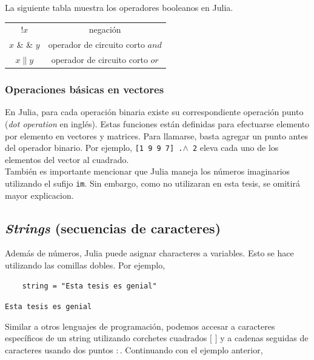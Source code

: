La siguiente tabla muestra los operadores booleanos en Julia. 

\begin{center}
\begin{tabular}{ |c|c| } 
 \hline
 $!x$ & negación \\ 
 $x$ \& \& $y$ & operador de circuito corto $and$ \\ 
 $x \parallel y$ & operador de circuito corto $or$ \\ 
 \hline
\end{tabular}
\end{center}

\subsubsection{Operaciones básicas en vectores}
En Julia, para cada operación binaria existe su correspondiente operación punto (\textit{dot operation} en inglés). Estas funciones están definidas para efectuarse elemento por elemento en vectores y matrices. Para llamarse, basta agregar un punto antes del operador binario. Por ejemplo,
 \texttt{[1 9 9 7] .$\wedge$ 2} eleva cada uno de los elementos del vector al cuadrado. 
\\
También es importante mencionar que Julia maneja los números imaginarios utilizando el sufijo \texttt{im}. Sin embargo, como no utilizaran en esta tesis, se omitirá mayor explicacion. 


\subsection{\textit{Strings} (secuencias de caracteres)} 

Además de números, Julia puede asignar characteres a variables. Esto se hace utilizando las comillas dobles. Por ejemplo,

\begin{verbatim}
    string = "Esta tesis es genial"
\end{verbatim}


\begin{tcolorbox}
      \texttt{Esta tesis es genial}
\end{tcolorbox}

Similar a otros lenguajes de programación, podemos accesar a caracteres específicos de un string utilizando corchetes cuadrados $[$ $]$ y a cadenas seguidas de caracteres usando dos puntos $:$. Continuando con el ejemplo anterior, 

